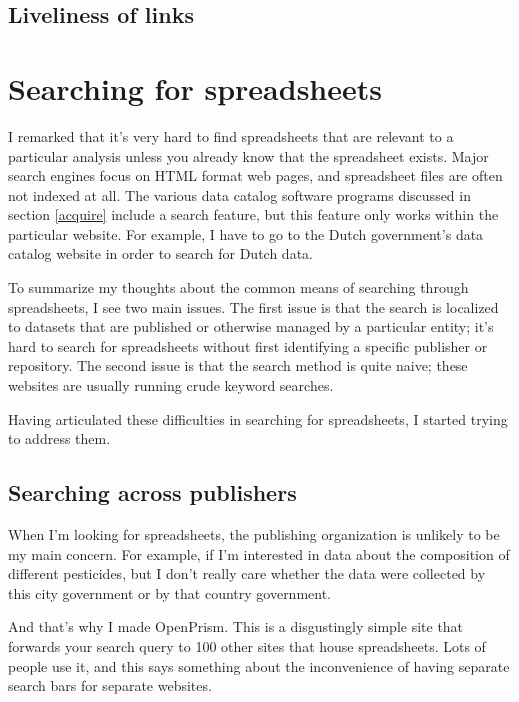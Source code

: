 \documentclass{acm_proc_article-sp}
\begin{document}
\subsection{Liveliness of links}









\section{Searching for spreadsheets}
I remarked that it's very hard to find spreadsheets that are relevant
to a particular analysis unless you already know that the spreadsheet exists.
Major search engines focus on HTML format web pages, and spreadsheet files
are often not indexed at all. The various data catalog software programs
discussed in section \ref{acquire} include a search feature, but this feature
only works within the particular website. For example, I have to go to the
Dutch government's data catalog website in order to search for Dutch data.

To summarize my thoughts about the common means of searching through
spreadsheets, I see two main issues.
The first issue is that the search is localized to datasets that are published
or otherwise managed by a particular entity; it's hard to search for
spreadsheets without first identifying a specific publisher or repository.
The second issue is that the search method is quite naive; these websites are
usually running crude keyword searches.

Having articulated these difficulties in searching for spreadsheets, I started
trying to address them.

\subsection{Searching across publishers}
When I'm looking for spreadsheets, the publishing organization is unlikely
to be my main concern. For example, if I'm interested in data about the
composition of different pesticides, but I don't really care whether the
data were collected by this city government or by that country government.

And that's why I made OpenPrism. This is a disgustingly simple site that
forwards your search query to 100 other sites that house spreadsheets.
Lots of people use it, and this says something about the inconvenience of
having separate search bars for separate websites.
\end{document}
